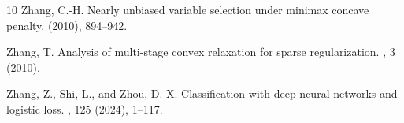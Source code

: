 \documentclass[10pt,twoside]{article}
\numberwithin{equation}{section}
\begin{document}
\begin{thebibliography}{10}
{\sc Zhang, C.-H.}
\newblock Nearly unbiased variable selection under minimax concave penalty.
 (2010), 894--942.

{\sc Zhang, T.}
\newblock Analysis of multi-stage convex relaxation for sparse regularization.
, 3 (2010).

{\sc Zhang, Z., Shi, L., and Zhou, D.-X.}
\newblock Classification with deep neural networks and logistic loss.
, 125 (2024), 1--117.

\end{thebibliography}


 
\end{document}

